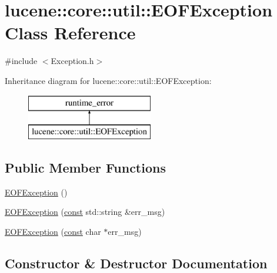 \hypertarget{classlucene_1_1core_1_1util_1_1EOFException}{}\section{lucene\+:\+:core\+:\+:util\+:\+:E\+O\+F\+Exception Class Reference}
\label{classlucene_1_1core_1_1util_1_1EOFException}


{\ttfamily \#include $<$Exception.\+h$>$}

Inheritance diagram for lucene\+:\+:core\+:\+:util\+:\+:E\+O\+F\+Exception\+:\begin{figure}[H]
\begin{center}
\leavevmode
\includegraphics[height=2.000000cm]{classlucene_1_1core_1_1util_1_1EOFException}
\end{center}
\end{figure}
\subsection*{Public Member Functions}
\begin{DoxyCompactItemize}
\item 
\mbox{\hyperlink{classlucene_1_1core_1_1util_1_1EOFException_a9f72a61badef4297678ec31fda543355}{E\+O\+F\+Exception}} ()
\item 
\mbox{\hyperlink{classlucene_1_1core_1_1util_1_1EOFException_a4c834615e855d3abc6452d5ad24f4e5d}{E\+O\+F\+Exception}} (\mbox{\hyperlink{ZlibCrc32_8h_a2c212835823e3c54a8ab6d95c652660e}{const}} std\+::string \&err\+\_\+msg)
\item 
\mbox{\hyperlink{classlucene_1_1core_1_1util_1_1EOFException_aea1b30e759de38b8497ca0059a8c042a}{E\+O\+F\+Exception}} (\mbox{\hyperlink{ZlibCrc32_8h_a2c212835823e3c54a8ab6d95c652660e}{const}} char $\ast$err\+\_\+msg)
\end{DoxyCompactItemize}


\subsection{Constructor \& Destructor Documentation}
\mbox{\label{classlucene_1_1core_1_1util_1_1EOFException_a9f72a61badef4297678ec31fda543355}} 
